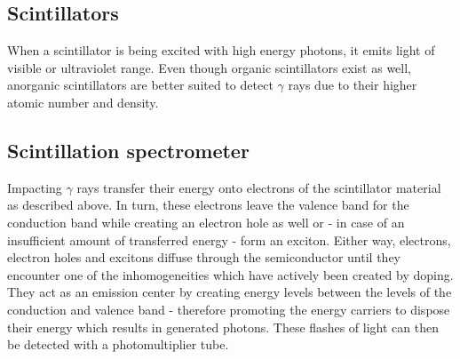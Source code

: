 \subsection{Scintillators}
When a scintillator is being excited with high energy photons, it emits light of visible or ultraviolet range.
Even though organic scintillators exist as well, anorganic scintillators are better suited to detect $\gamma$ rays due to their higher atomic number and density. \cite{Anleitung}
%
\subsection{Scintillation spectrometer}
Impacting $\gamma$ rays transfer their energy onto electrons of the scintillator material as described above.
In turn, these electrons leave the valence band for the conduction band while creating an electron hole as well or - in case of an insufficient amount of transferred energy - form an exciton.
Either way, electrons, electron holes and excitons diffuse through the semiconductor until they encounter one of the inhomogeneities which have actively been created by doping.
They act as an emission center by creating energy levels between the levels of the conduction and valence band - therefore promoting the energy carriers to dispose their energy which results in generated photons.
These flashes of light can then be detected with a photomultiplier tube.
